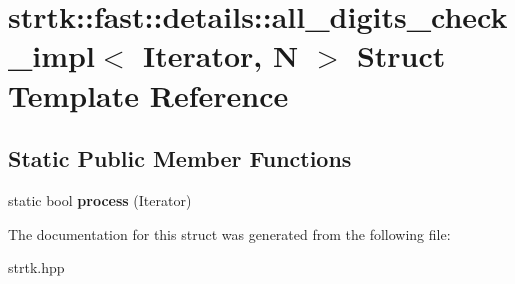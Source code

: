 \hypertarget{structstrtk_1_1fast_1_1details_1_1all__digits__check__impl}{\section{strtk\-:\-:fast\-:\-:details\-:\-:all\-\_\-digits\-\_\-check\-\_\-impl$<$ Iterator, N $>$ Struct Template Reference}
\label{structstrtk_1_1fast_1_1details_1_1all__digits__check__impl}
}
\subsection*{Static Public Member Functions}
\begin{DoxyCompactItemize}
\item 
\hypertarget{structstrtk_1_1fast_1_1details_1_1all__digits__check__impl_a2ba1ed61f81f457a770cc0e25d7729cd}{static bool {\bfseries process} (Iterator)}\label{structstrtk_1_1fast_1_1details_1_1all__digits__check__impl_a2ba1ed61f81f457a770cc0e25d7729cd}

\end{DoxyCompactItemize}


The documentation for this struct was generated from the following file\-:\begin{DoxyCompactItemize}
\item 
strtk.\-hpp\end{DoxyCompactItemize}
